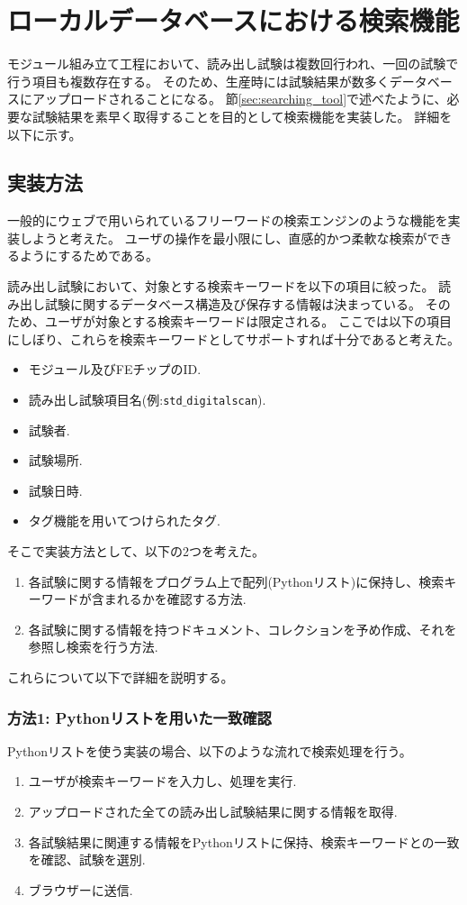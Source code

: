\chapter{ローカルデータベースにおける検索機能}\label{chap:search_func}

モジュール組み立て工程において、読み出し試験は複数回行われ、一回の試験で行う項目も複数存在する。
そのため、生産時には試験結果が数多くデータベースにアップロードされることになる。
節\ref{sec:searching_tool}で述べたように、必要な試験結果を素早く取得することを目的として検索機能を実装した。
詳細を以下に示す。

\section{実装方法}
一般的にウェブで用いられているフリーワードの検索エンジンのような機能を実装しようと考えた。
ユーザの操作を最小限にし、直感的かつ柔軟な検索ができるようにするためである。

読み出し試験において、対象とする検索キーワードを以下の項目に絞った。
読み出し試験に関するデータベース構造及び保存する情報は決まっている。
そのため、ユーザが対象とする検索キーワードは限定される。
ここでは以下の項目にしぼり、これらを検索キーワードとしてサポートすれば十分であると考えた。

\begin{itemize}
  \item モジュール及びFEチップのID.
  \item 読み出し試験項目名(例:\texttt{std$\_$digitalscan}).
  \item 試験者.
  \item 試験場所.
  \item 試験日時.
  \item タグ機能を用いてつけられたタグ.
\end{itemize}

そこで実装方法として、以下の2つを考えた。

\begin{enumerate}
  \item 各試験に関する情報をプログラム上で配列(Pythonリスト)に保持し、検索キーワードが含まれるかを確認する方法.
  \item 各試験に関する情報を持つドキュメント、コレクションを予め作成、それを参照し検索を行う方法.
\end{enumerate}

これらについて以下で詳細を説明する。

\subsection{方法1: Pythonリストを用いた一致確認}
Pythonリストを使う実装の場合、以下のような流れで検索処理を行う。
\begin{enumerate}
  \item ユーザが検索キーワードを入力し、処理を実行.
  \item アップロードされた全ての読み出し試験結果に関する情報を取得.
  \item 各試験結果に関連する情報をPythonリストに保持、検索キーワードとの一致を確認、試験を選別.
  \item ブラウザーに送信.
\end{enumerate}

